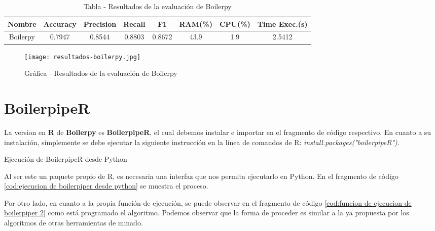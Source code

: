 \begin{table}[h]
    \begin{center}
      \begin{tabular}{| c | c | c | c | c | c | c | c |} \hline 
       \textbf{Nombre} & \textbf{Accuracy} & \textbf{Precision}  & \textbf{Recall} & \textbf{F1} & \textbf{RAM(\%)} & \textbf{CPU(\%)} & \textbf{Time Exec.(s)} \\ \hline
       Boilerpy & 0.7947 & 0.8544 & 0.8803 & 0.8672 & 43.9 & 1.9 & 2.5412 \\ \hline
      \end{tabular}
      \caption{Tabla - Resultados de la evaluación de Boilerpy}
      \label{tab:tabla - resultados de la evaluacion de boilerpy}
    \end{center}
\end{table}

\begin{figure}[tphb]
    \centering
    \texttt{[image: resultados-boilerpy.jpg]}
    \caption{Gráfica - Resultados de la evaluación de Boilerpy}
    \label{img:grafica - resultados de la evaluacion de boilerpy}
\end{figure}

\section*{BoilerpipeR}

La version en \textbf{R} de \textbf{Boilerpy} es \textbf{BoilerpipeR}, el cual debemos instalar e importar 
en el fragmento de código respectivo. En cuanto a su instalación, simplemente se debe ejecutar la siguiente 
instrucción en la línea de comandos de R: \emph{install.packages("boilerpipeR")}.

\begin{codefloat}
    
    \caption{Ejecución de BoilerpipeR desde Python}
    \label{cod:ejecucion de boilerpiper desde python}
\end{codefloat}

Al ser este un paquete propio de R, es necesaria una interfaz que nos permita ejecutarlo en Python. En el
fragmento de código \ref{cod:ejecucion de boilerpiper desde python} se muestra el proceso.

Por otro lado, en cuanto a la propia función de ejecución, se puede observar en el fragmento de código
\ref{cod:funcion de ejecucion de boilerpiper 2} como está programado el algoritmo. Podemos observar que la 
forma de proceder es similar a la ya propuesta por los algoritmos de otras herramientas de minado.

